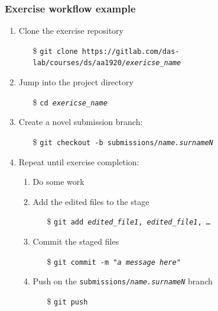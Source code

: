 \documentclass[handout]{beamer}\mode<presentation>{\usetheme{AMSCesenaPurpleAndGold}}
\begin{document}
\begin{frame}[allowframebreaks]
\frametitle{Exercise workflow example}

    \begin{enumerate}
        \item Clone the exercise repository
        \begin{itemize}
            \item[\$] \texttt{git clone https://gitlab.com/das-lab/courses/ds/aa1920/\alert{\textit{exericse\_name}}}
        \end{itemize}
        
        \item Jump into the project directory
        \begin{itemize}
            \item[\$] \texttt{cd \alert{\textit{exericse\_name}}}
        \end{itemize}
        
        \item Create a novel submission branch:
        \begin{itemize}
            \item[\$] \texttt{git checkout -b submissions/\textit{\alert{name.surnameN}}}
        \end{itemize}
        
        \item Repeat until exercise completion:
        \begin{enumerate}
            \item Do some work
            \item Add the edited files to the stage
            \begin{itemize}
                \item[\$] \texttt{git add \textit{\alert{edited\_file1}}, \textit{\alert{edited\_file1}}, \ldots}
            \end{itemize}
            \item Commit the staged files 
            \begin{itemize}
                \item[\$] \texttt{git commit -m "\textit{\alert{a message here}}"}
            \end{itemize}
            \item Push on the \texttt{submissions/\textit{\alert{name.surnameN}}} branch
            \begin{itemize}
                \item[\$] \texttt{git \alert{push}}
            \end{itemize}
        \end{enumerate}
        

\end{enumerate}
\end{frame}
\end{document}
